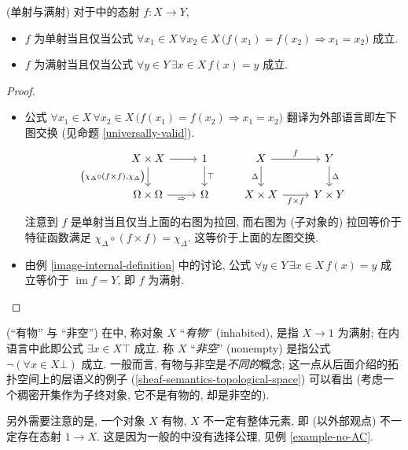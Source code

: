 \begin{example}
	{(单射与满射)}
	对于\topos{}中的态射 $f\colon X\to Y$,
	\begin{itemize}
		\item $f$ 为单射当且仅当公式 $\forall x_1\in X\,\forall x_2\in X\,\big(f(x_1)=f(x_2)\Rightarrow x_1=x_2\big)$ 成立.
		\item $f$ 为满射当且仅当公式 $\forall y\in Y\, \exists x\in X\, f(x)=y$ 成立.
	\end{itemize}
\end{example}
\begin{proof}~
	\begin{itemize}
		\item 公式 $\forall x_1\in X\,\forall x_2\in X\,\big(f(x_1)=f(x_2)\Rightarrow x_1=x_2\big)$ 翻译为外部语言即左下图交换 (见命题 \ref{universally-valid}).
		\[\begin{tikzcd}[ampersand replacement=\&]
			{X\times X} \& 1 \& X \& Y \\
			\Omega\times\Omega \& \Omega \& {X\times X} \& {Y\times Y}
			\arrow["{\big(\chi_\Delta\circ (f\times f),\chi_\Delta\big)}"', from=1-1, to=2-1]
			\arrow["\Rightarrow"', from=2-1, to=2-2]
			\arrow[from=1-1, to=1-2]
			\arrow["\top", from=1-2, to=2-2]
			\arrow["{f\times f}"', from=2-3, to=2-4]
			\arrow["\Delta"', from=1-3, to=2-3]
			\arrow["\Delta", from=1-4, to=2-4]
			\arrow["f", from=1-3, to=1-4]
		\end{tikzcd}\]
		注意到 $f$ 是单射当且仅当上面的右图为拉回, 而右图为 (子对象的) 拉回等价于特征函数满足 $\chi_\Delta\circ (f\times f) = \chi_\Delta$.
		这等价于上面的左图交换.
		\item 由例 \ref{image-internal-definition} 中的讨论, 公式 $\forall y\in Y\, \exists x\in X\, f(x)=y$ 成立等价于 $\operatorname{im}f=Y$, 即 $f$ 为满射.
	\end{itemize}
\end{proof}

\begin{example}
	[label={inhabited-vs-nonempty}]
	{(``有物'' 与 ``非空'')}
	在\topos{}中, 称对象 $X$ ``\emph{有物}'' (inhabited), 是指 $X\to 1$ 为满射; 在内语言中此即公式 $\exists x\in X \top$ 成立. 称 $X$ ``\emph{非空}'' (nonempty) 是指公式 $\neg(\forall x\in X \bot)$ 成立. 一般而言, 有物与非空是\emph{不同的}概念; 这一点从后面介绍的拓扑空间上的层语义的例子 (\ref{sheaf-semantics-topological-space}) 可以看出 (考虑一个稠密开集作为子终对象, 它不是有物的, 却是非空的).
	
	另外需要注意的是, 一个对象 $X$ 有物, $X$ 不一定有整体元素, 即 (以外部观点) 不一定存在态射 $1\to X$. 这是因为一般的\topos{}中没有选择公理, 见例 \ref{example-no-AC}.
\end{example}

